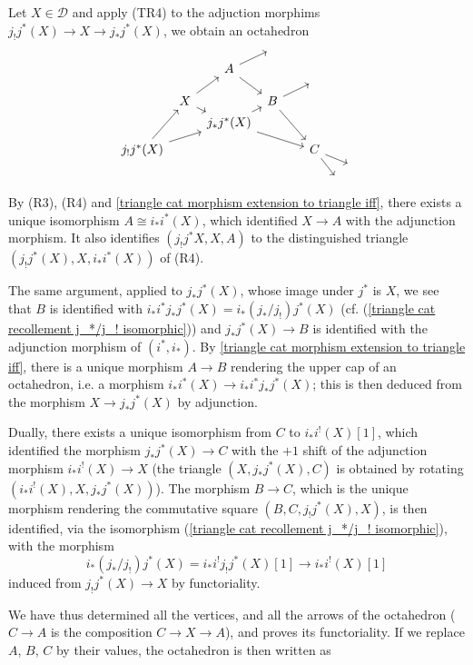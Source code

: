 Let $X\in\mathcal{D}$ and apply (TR4) to the adjuction morphims $j_!j^*(X)\to X\to j_*j^*(X)$, we obtain an octahedron
\begin{equation*}
\begin{tikzcd}[row sep=2pt,column sep=4pt]
&&&{}&\\
&&A\ar[ru]\ar[rdd]&&\\
&&&{}&{}&{}\\
&X\ar[rd]\ar[ruu]&&B\ar[rru]\ar[rrddd]\\
&&j_*j^*(X)\ar[ru]\ar[rrrdd]&&\\
&&&&\\
j_!j^*(X)\ar[ruuu]\ar[rruu]&&&&&C\ar[rdd]\ar[rrd]\\
&&&&&&&{}\\
&&&&&&{}&
\end{tikzcd}
\vspace*{-2mm}
\end{equation*}
By (R3), (R4) and \cref{triangle cat morphism extension to triangle iff}, there exists a unique isomorphism $A\cong i_*i^*(X)$, which identified $X\to A$ with the adjunction morphism. It also identifies $(j_!j^*X,X,A)$ to the distinguished triangle $(j_!j^*(X),X,i_*i^*(X))$ of (R4).\par
The same argument, applied to $j_*j^*(X)$, whose image under $j^*$ is $X$, we see that $B$ is identified with $i_*i^*j_*j^*(X)=i_*(j_*/j_!)j^*(X)$ (cf. (\ref{triangle cat recollement j_*/j_! isomorphic})) and $j_*j^*(X)\to B$ is identified with the adjunction morphism of $(i^*,i_*)$. By \cref{triangle cat morphism extension to triangle iff}, there is a unique morphism $A\to B$ rendering the upper cap of an octahedron, i.e. a morphism $i_*i^*(X)\to i_*i^*j_*j^*(X)$; this is then deduced from the morphism $X\to j_*j^*(X)$ by adjunction.\par
Dually, there exists a unique isomorphism from $C$ to $i_*i^!(X)[1]$, which identified the morphism $j_*j^*(X)\to C$ with the $+1$ shift of the adjunction morphism $i_*i^!(X)\to X$ (the triangle $(X,j_*j^*(X),C)$ is obtained by rotating $(i_*i^!(X),X,j_*j^*(X))$). The morphism $B\to C$, which is the unique morphism rendering the commutative square $(B,C,j_!j^*(X),X)$, is then identified, via the isomorphism (\ref{triangle cat recollement j_*/j_! isomorphic}), with the morphism
\[i_*(j_*/j_!)j^*(X)=i_*i^!j_!j^*(X)[1]\to i_*i^!(X)[1]\]
induced from $j_!j^*(X)\to X$ by functoriality.\par
We have thus determined all the vertices, and all the arrows of the octahedron ($C\to A$ is the composition $C\to X\to A$), and proves its functoriality. If we replace $A$, $B$, $C$ by their values, the octahedron is then written as 
